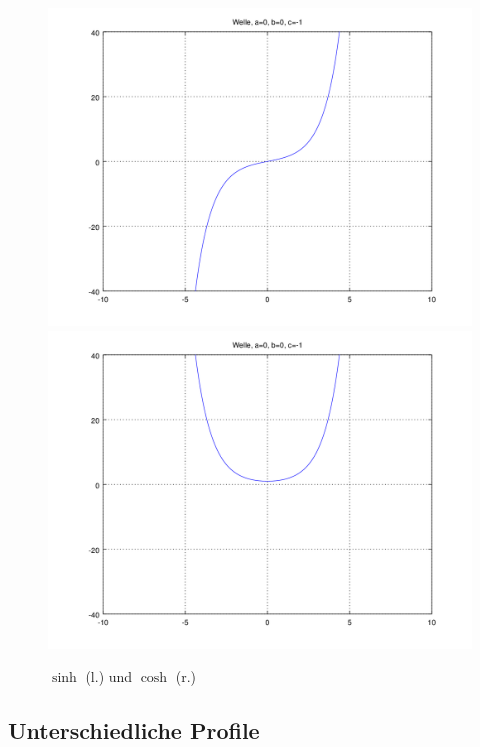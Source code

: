 \begin{figure}
	\includegraphics[scale=0.35]{./wellen/images/basicfunctions/sinh.png}
	\includegraphics[scale=0.35]{./wellen/images/basicfunctions/cosh.png}
	\caption{$\sinh$ (l.) und $\cosh$ (r.)}
	\label{fig:wellen:sinh-cosh}
\end{figure}

\subsection{Unterschiedliche Profile}
\label{subsec:wellen:profilformen}

